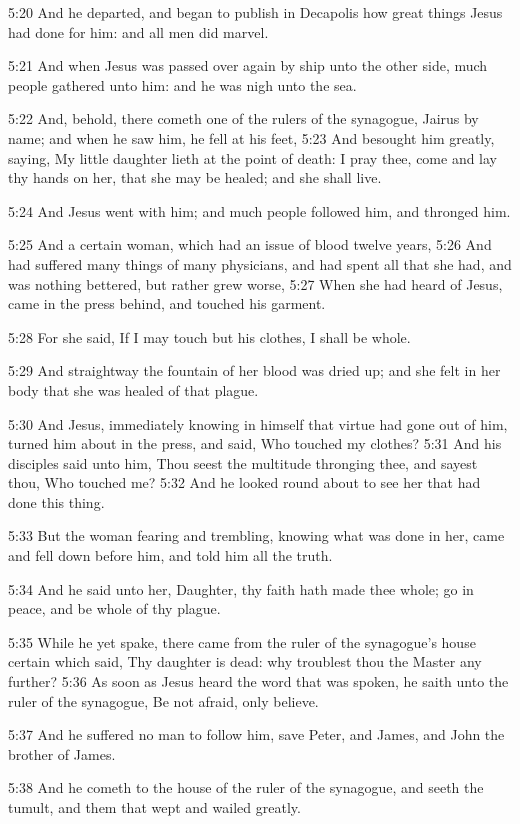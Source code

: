 5:20 And he departed, and began to publish in Decapolis how great
things Jesus had done for him: and all men did marvel.

5:21 And when Jesus was passed over again by ship unto the other side,
much people gathered unto him: and he was nigh unto the sea.

5:22 And, behold, there cometh one of the rulers of the synagogue,
Jairus by name; and when he saw him, he fell at his feet, 5:23 And
besought him greatly, saying, My little daughter lieth at the point of
death: I pray thee, come and lay thy hands on her, that she may be
healed; and she shall live.

5:24 And Jesus went with him; and much people followed him, and
thronged him.

5:25 And a certain woman, which had an issue of blood twelve years,
5:26 And had suffered many things of many physicians, and had spent
all that she had, and was nothing bettered, but rather grew worse,
5:27 When she had heard of Jesus, came in the press behind, and
touched his garment.

5:28 For she said, If I may touch but his clothes, I shall be whole.

5:29 And straightway the fountain of her blood was dried up; and she
felt in her body that she was healed of that plague.

5:30 And Jesus, immediately knowing in himself that virtue had gone
out of him, turned him about in the press, and said, Who touched my
clothes?  5:31 And his disciples said unto him, Thou seest the
multitude thronging thee, and sayest thou, Who touched me?  5:32 And
he looked round about to see her that had done this thing.

5:33 But the woman fearing and trembling, knowing what was done in
her, came and fell down before him, and told him all the truth.

5:34 And he said unto her, Daughter, thy faith hath made thee whole;
go in peace, and be whole of thy plague.

5:35 While he yet spake, there came from the ruler of the synagogue's
house certain which said, Thy daughter is dead: why troublest thou the
Master any further?  5:36 As soon as Jesus heard the word that was
spoken, he saith unto the ruler of the synagogue, Be not afraid, only
believe.

5:37 And he suffered no man to follow him, save Peter, and James, and
John the brother of James.

5:38 And he cometh to the house of the ruler of the synagogue, and
seeth the tumult, and them that wept and wailed greatly.

